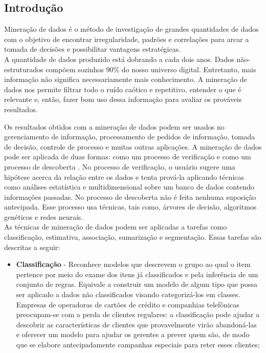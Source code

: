 \documentclass[a4paper, 12pt]{article}
\begin{document}
	\begin{multicols}{2}
		\section{Introdução}
		Mineração de dados é o método de investigação de grandes quantidades de dados com o objetivo de encontrar irregularidade, padrões e correlações para arcar a tomada de decisões e possibilitar vantagens estratégicas.\\
		
		A quantidade de dados produzido está dobrando a cada dois anos. Dados não-estruturados compõem sozinhos 90\% do nosso universo digital. Entretanto, mais informação não significa necessariamente mais conhecimento. A mineração de dados nos permite filtrar todo o ruído caótico e repetitivo, entender o que é relevante e, então, fazer bom uso dessa informação para avaliar os prováveis resultados.
		
		Os resultados obtidos com a mineração de dados podem ser usados no gerenciamento de informação, processamento de pedidos de informação, tomada de decisão, controle de processo e muitas outras aplicações. A mineração de dados pode ser aplicada de duas formas: como um processo de verificação e como um processo de descoberta . No processo de verificação, o usuário sugere uma hipótese acerca da relação entre os dados e tenta prová-la aplicando técnicas como análises estatística e multidimensional sobre um banco de dados contendo informações passadas. No processo de descoberta não é feita nenhuma suposição antecipada. Esse processo usa técnicas, tais como, árvores de decisão, algoritmos genéticos e redes neurais.\\
		
		As técnicas de mineração de dados podem ser aplicadas a tarefas como classificação, estimativa, associação, sumarização e segmentação. Essas tarefas são descritas a seguir:
		\begin{itemize}
			\item \textbf{Classificação} - Reconhece modelos que descrevem o grupo ao qual o item pertence por meio do exame dos itens já classificados e pela inferência de um conjunto de regras. Equivale  a construir um modelo de algum tipo que possa ser aplicado a dados não classificados visando categorizá-los em classes.  Empresas de operadoras de cartões de crédito e companhias telefônicas preocupam-se com a perda de clientes regulares: a classificação pode ajudar a descobrir as características de clientes que provavelmente virão abandoná-las e oferecer um modelo para ajudar os gerentes a prever quem são, de modo que se elabore antecipadamente campanhas especiais para reter esses clientes;
			

\end{itemize}
\end{multicols}
\end{document}
